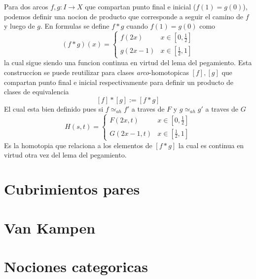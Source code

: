 \documentclass[letterpaper]{article}
\theoremstyle{definition}
\theoremstyle{plain}
\begin{document}
Para dos arcos \(f,g : I \to X\) que compartan punto final e inicial
(\(f(1) = g(0)\)), podemos definir una nocion de producto que corresponde
a seguir el camino de \(f\) y luego de \(g\). En formulas se define \(f *
g\) cuando \(f(1) = g(0)\) como
\[ (f*g) (x) = \begin{cases}
    f(2x) & x \in [0,\frac{1}{2}] \\
    g(2x - 1) & x \in [\frac{1}{2} , 1]
  \end{cases}
\]
la cual sigue siendo una funcion continua en virtud del lema del
pegamiento. Esta construccion se puede reutilizar para clases
\emph{arco}-homotopicas \([f],[g]\) que compartan punto final e inicial
respectivamente para definir un producto de clases de equivalencia
\[ [f] * [g] := [f * g]\]
El cual esta bien definido pues si \(f \simeq_{ah} f'\) a traves de \(F\)
y \(g \simeq_{ah} g'\) a traves de \(G\)
\[H(s,t) = \begin{cases}
    F(2x,t) & x \in [0, \frac{1}{2}] \\
    G(2x - 1, t) & x \in [\frac{1}{2} , 1]
  \end{cases}
\]
Es la homotopia que relaciona a los elementos de \([f*g]\) la cual es
continua en virtud otra vez del lema del pegamiento.
\section{Cubrimientos pares}

\section{Van Kampen}

\section{Nociones categoricas}
\end{document}
